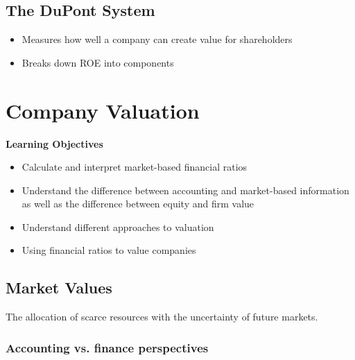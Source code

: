 \documentclass{article}
\begin{document}
	\subsection{The DuPont System}

		\begin{itemize}
			\item Measures how well a company can create value for shareholders
			\item Breaks down ROE into components
		\end{itemize}

\section{Company Valuation}

	\textbf{Learning Objectives}

		\begin{itemize}
			\item Calculate and interpret market-based financial ratios
			\item Understand the difference between accounting and market-based information as well as the difference between equity and firm value
			\item Understand different approaches to valuation
			\item Using financial ratios to value companies
		\end{itemize}

	\subsection{Market Values}

		The allocation of scarce resources with the uncertainty of future markets.

		\subsubsection{Accounting vs. finance perspectives}
\end{document}
